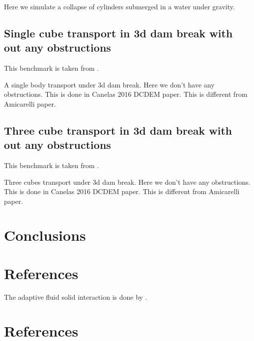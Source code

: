 \documentclass[preprint,12pt]{elsarticle}
\begin{document}
Here we simulate a collapse of cylinders submerged in a water under gravity.


\subsection{Single cube transport in 3d dam break with out any obstructions}
\label{sec:single-cube-transport-in-3d-dam-break-with-out-any-obstructions}

This benchmark is taken from \citet{ji2019coupled}.

A single body transport under 3d dam break. Here we don't have any
obstructions. This is done in Canelas 2016 DCDEM paper. This is different from
Amicarelli paper.


\subsection{Three cube transport in 3d dam break with out any obstructions}
\label{sec:three-cube-transport-in-3d-dam-break-with-out-any-obstructions}

This benchmark is taken from \citet{ji2019coupled}.

Three cubes transport under 3d dam break. Here we don't have any obstructions.
This is done in Canelas 2016 DCDEM paper. This is different from Amicarelli
paper.


\section{Conclusions}
\label{sec:conclusions}


\section*{References}
\label{sec:references}

The adaptive fluid solid interaction is done by \citet{hu2019consistent}.


\section*{References}


\end{document}
